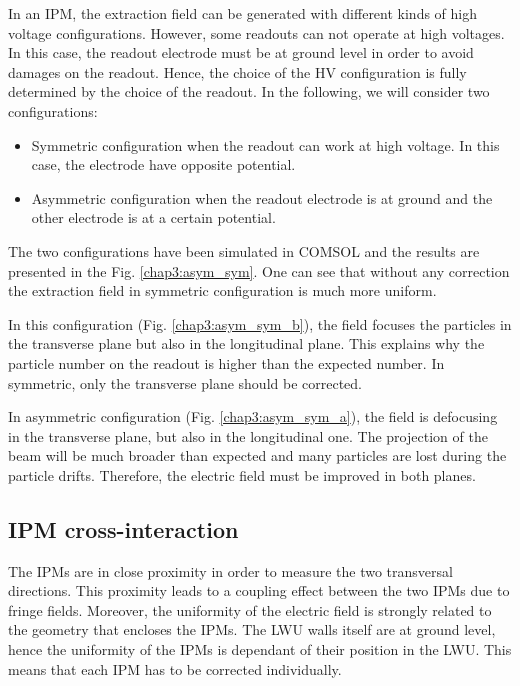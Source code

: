 \begin{refsection}
	In an IPM, the extraction field can be generated with different kinds of high voltage configurations. However, some readouts can not operate at high voltages. In this case, the readout electrode must be at ground level in order to avoid damages on the readout. Hence, the choice of the HV configuration is fully determined by the choice of the readout. In the following, we will consider two configurations:
	\begin{itemize}
		\item Symmetric configuration when the readout can work at high voltage. In this case, the electrode have opposite potential.
		\item Asymmetric configuration when the readout electrode is at ground and the other electrode is at a certain potential.
	\end{itemize}

	The two configurations have been simulated in COMSOL and the results are presented in the Fig. \ref{chap3:asym_sym}. One can see that without any correction the extraction field in symmetric configuration is much more uniform.

	

	In this configuration (Fig. \ref{chap3:asym_sym_b}), the field focuses the particles in the transverse plane but also in the longitudinal plane. This explains why the particle number on the readout is higher than the expected number. In symmetric, only the transverse plane should be corrected.

	In asymmetric configuration (Fig. \ref{chap3:asym_sym_a}), the field is defocusing in the transverse plane, but also in the  longitudinal one. The projection of the beam will be much broader than expected and many particles are lost during the particle drifts. Therefore, the electric field must be improved in both planes.


	\subsection{IPM cross-interaction}

	The IPMs are in close proximity in order to measure the two transversal  directions. This proximity leads to a coupling effect between the two IPMs due to fringe fields. Moreover, the uniformity of the electric field is strongly related to the geometry that encloses the IPMs. The LWU walls itself are at ground level, hence the uniformity of the IPMs is dependant of their position in the LWU. This means that each IPM has to be corrected individually.


\end{refsection}

